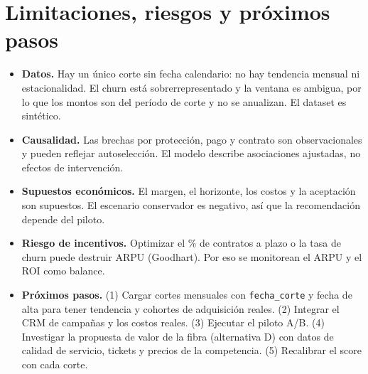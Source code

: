 \documentclass[10.5pt,a4paper]{article}
\begin{document}
\section{Limitaciones, riesgos y próximos pasos}
\begin{itemize}
  \item \textbf{Datos.} Hay un único corte sin fecha calendario: no hay tendencia mensual ni estacionalidad. El churn está sobrerrepresentado y la ventana es ambigua, por lo que los montos son del período de corte y no se anualizan. El dataset es sintético.
  \item \textbf{Causalidad.} Las brechas por protección, pago y contrato son observacionales y pueden reflejar autoselección. El modelo describe asociaciones ajustadas, no efectos de intervención.
  \item \textbf{Supuestos económicos.} El margen, el horizonte, los costos y la aceptación son supuestos. El escenario conservador es negativo, así que la recomendación depende del piloto.
  \item \textbf{Riesgo de incentivos.} Optimizar el \% de contratos a plazo o la tasa de churn puede destruir ARPU (Goodhart). Por eso se monitorean el ARPU y el ROI como balance.
  \item \textbf{Próximos pasos.} (1) Cargar cortes mensuales con \texttt{fecha\_corte} y fecha de alta para tener tendencia y cohortes de adquisición reales. (2) Integrar el CRM de campañas y los costos reales. (3) Ejecutar el piloto A/B. (4) Investigar la propuesta de valor de la fibra (alternativa D) con datos de calidad de servicio, tickets y precios de la competencia. (5) Recalibrar el score con cada corte.
\end{itemize}

\end{document}
